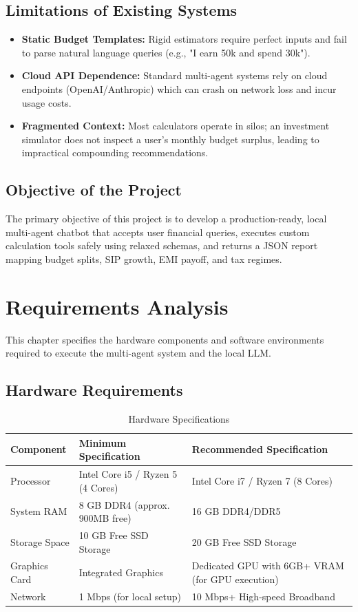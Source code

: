 \documentclass[12pt,a4paper]{report}
\begin{document}
\section{Limitations of Existing Systems}
\begin{itemize}
    \item \textbf{Static Budget Templates:} Rigid estimators require perfect inputs and fail to parse natural language queries (e.g., "I earn 50k and spend 30k").
    \item \textbf{Cloud API Dependence:} Standard multi-agent systems rely on cloud endpoints (OpenAI/Anthropic) which can crash on network loss and incur usage costs.
    \item \textbf{Fragmented Context:} Most calculators operate in silos; an investment simulator does not inspect a user's monthly budget surplus, leading to impractical compounding recommendations.
\end{itemize}

\section{Objective of the Project}
The primary objective of this project is to develop a production-ready, local multi-agent chatbot that accepts user financial queries, executes custom calculation tools safely using relaxed schemas, and returns a JSON report mapping budget splits, SIP growth, EMI payoff, and tax regimes.

\clearpage
\chapter{Requirements Analysis}
This chapter specifies the hardware components and software environments required to execute the multi-agent system and the local LLM.

\section{Hardware Requirements}
\begin{table}[H]
    \centering
    \caption{Hardware Specifications}
    \begin{tabular}{lll}
        \toprule
        \textbf{Component} & \textbf{Minimum Specification} & \textbf{Recommended Specification} \\
        \midrule
        Processor & Intel Core i5 / Ryzen 5 (4 Cores) & Intel Core i7 / Ryzen 7 (8 Cores) \\
        System RAM & 8 GB DDR4 (approx. 900MB free) & 16 GB DDR4/DDR5 \\
        Storage Space & 10 GB Free SSD Storage & 20 GB Free SSD Storage \\
        Graphics Card & Integrated Graphics & Dedicated GPU with 6GB+ VRAM (for GPU execution) \\
        Network & 1 Mbps (for local setup) & 10 Mbps+ High-speed Broadband \\
        \bottomrule
    \end{tabular}
\end{table}
\end{document}
